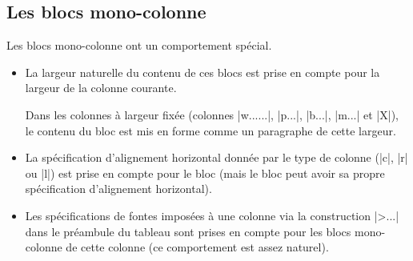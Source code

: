 \documentclass[dvipsnames]{article}%
\begin{document}
\subsection{Les blocs mono-colonne}

Les blocs mono-colonne ont un comportement spécial.
\begin{itemize}
\item La largeur naturelle du contenu de ces blocs est prise en compte pour la
largeur de la colonne courante.

Dans les colonnes à largeur fixée (colonnes |w{...}{...}|, |p{...}|, |b{...}|,
|m{...}| et |X|), le contenu du bloc est mis en forme comme un paragraphe de
cette largeur.

\item La spécification d'alignement horizontal donnée par le type de
colonne (|c|, |r| ou |l|) est prise en compte pour le bloc (mais le bloc peut
avoir sa propre spécification d'alignement horizontal).

\item Les spécifications de fontes imposées à une colonne via la construction
|>{...}| dans le préambule du tableau sont prises en compte pour les
blocs mono-colonne de cette colonne (ce comportement est assez naturel).
\end{itemize}
\end{document}
